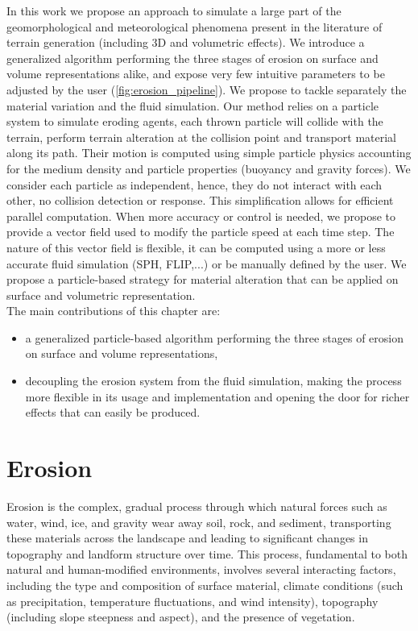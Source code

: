 In this work we propose an approach to simulate a large part of the geomorphological and meteorological phenomena present in the literature of terrain generation (including 3D and volumetric effects). We introduce a generalized algorithm performing the three stages of erosion on surface and volume representations alike, and expose very few intuitive parameters to be adjusted by the user (\cref{fig:erosion_pipeline}).
We propose to tackle separately the material variation and the fluid simulation. Our method relies on a particle system to simulate eroding agents, each thrown particle will collide with the terrain, perform terrain alteration at the collision point and transport material along its path. 
Their motion is computed using simple particle physics accounting for the medium density and particle properties (buoyancy and gravity forces). We consider each particle as independent, hence, they do not interact with each other, no collision detection or response. This simplification allows for efficient parallel computation. 
When more accuracy or control is needed, we propose to provide a vector field used to modify the particle speed at each time step. The nature of this vector field is flexible, it can be computed using a more or less accurate fluid simulation (SPH, FLIP,...) or be manually defined by the user. We propose a particle-based strategy for material alteration that can be applied on surface and volumetric representation. \\
The main contributions of this chapter are: 
\begin{itemize}
\item a generalized particle-based algorithm performing the three
stages of erosion on surface and volume representations,
\item decoupling the erosion system from the fluid simulation, making the process more flexible in its usage and implementation and opening the door for richer effects that can easily be produced.
\end{itemize}

\section{Erosion}
Erosion is the complex, gradual process through which natural forces such as water, wind, ice, and gravity wear away soil, rock, and sediment, transporting these materials across the landscape and leading to significant changes in topography and landform structure over time. This process, fundamental to both natural and human-modified environments, involves several interacting factors, including the type and composition of surface material, climate conditions (such as precipitation, temperature fluctuations, and wind intensity), topography (including slope steepness and aspect), and the presence of vegetation.

